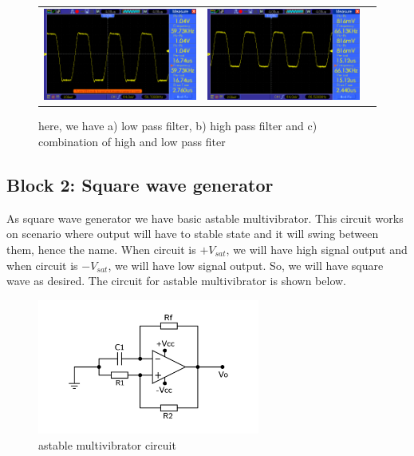 \documentclass[14pt,a4paper]{extarticle}
\begin{document}
\begin{figure}[ht]
\begin{tabular}{ccc}
    \includegraphics[width=0.33\linewidth]{imgs/square60k.png}&
    \includegraphics[width=0.33\linewidth]{imgs/square66k.png}
\end{tabular}
\vspace{0.2cm}
\caption{here, we have a) low pass filter, b) high pass filter and c) combination of high and low pass fiter}
\label{fig:filters}
\end{figure}










\subsection{Block 2: Square wave generator}
\label{sec:org6e42c7f}

As square wave generator we have basic astable multivibrator. This circuit works on scenario where output will have to stable state and it will swing between them, hence the name. When circuit is \(+V_{sat}\), we will have high signal output and when circuit is \(-V_{sat}\), we will have low signal output. So, we will have square wave as desired. The circuit for astable multivibrator is shown below.

\begin{figure}[H]
    \centering
    \label{square}
    \includegraphics[width=0.65\textwidth]{imgs/square.png}
    \caption{astable multivibrator circuit}
\end{figure}
\end{document}
